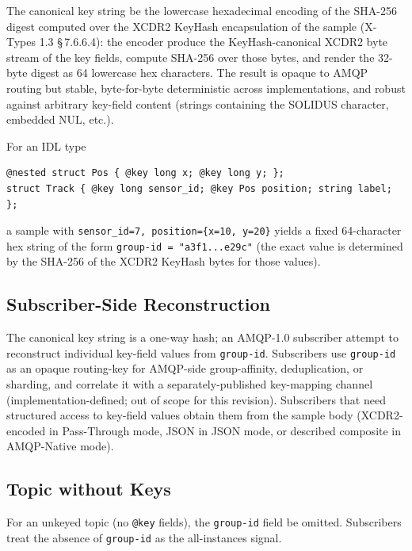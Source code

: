 \documentclass{../styles/zerodds-vendor-spec}
\begin{document}
The canonical key string  be the lowercase
hexadecimal encoding of the SHA-256 digest computed over the
XCDR2 KeyHash encapsulation of the sample (X-Types 1.3
\S\,7.6.6.4): the encoder  produce the
KeyHash-canonical XCDR2 byte stream of the key fields, compute
SHA-256 over those bytes, and render the 32-byte digest as 64
lowercase hex characters. The result is opaque to AMQP routing
but stable, byte-for-byte deterministic across implementations,
and robust against arbitrary key-field content (strings
containing the SOLIDUS character, embedded NUL, etc.).

\begin{specexample}
For an IDL type
\begin{lstlisting}
@nested struct Pos { @key long x; @key long y; };
struct Track { @key long sensor_id; @key Pos position; string label; };
\end{lstlisting}
a sample with \texttt{sensor\_id=7, position=\{x=10, y=20\}}
yields a fixed 64-character hex string of the form
\texttt{group-id = "a3f1...e29c"} (the exact value is determined
by the SHA-256 of the XCDR2 KeyHash bytes for those values).
\end{specexample}

\subsection{Subscriber-Side Reconstruction}

The canonical key string is a one-way hash; an AMQP-1.0
subscriber  attempt to reconstruct individual
key-field values from \texttt{group-id}. Subscribers 
use \texttt{group-id} as an opaque routing-key for AMQP-side
group-affinity, deduplication, or sharding, and 
correlate it with a separately-published key-mapping channel
(implementation-defined; out of scope for this revision).
Subscribers that need structured access to key-field values
 obtain them from the sample body (XCDR2-encoded
in Pass-Through mode, JSON in JSON mode, or described composite
in AMQP-Native mode).

\subsection{Topic without Keys}

For an unkeyed topic (no \texttt{@key} fields), the
\texttt{group-id} field  be omitted. Subscribers
 treat the absence of \texttt{group-id} as the
all-instances signal.
\end{document}
